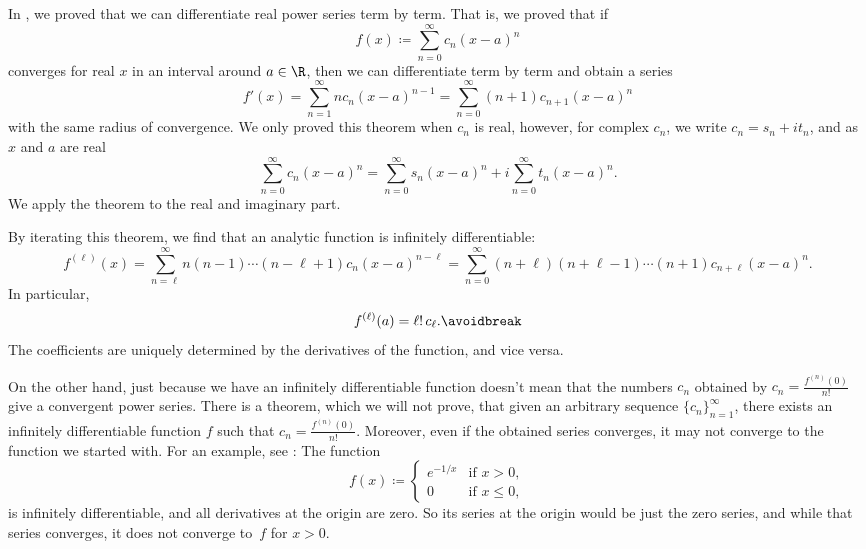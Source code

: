 In , we proved that we can
differentiate real power series term by term.  That is,
we proved that if
\begin{equation*}
f(x) \coloneqq \sum_{n=0}^\infty c_n {(x-a)}^n
\end{equation*}
converges for real $x$ in an interval around $a \in \R$, then we can differentiate
term by term and obtain a series
\begin{equation*}
f'(x) =
\sum_{n=1}^\infty n c_n {(x-a)}^{n-1}
=
\sum_{n=0}^\infty (n+1)c_{n+1} {(x-a)}^{n} 
\end{equation*}
with the same radius of convergence.
We only proved this theorem when $c_n$ is real, however, for complex $c_n$,
we write
$c_n = s_n + i t_n$, and as $x$ and $a$ are real
\begin{equation*}
\sum_{n=0}^\infty c_n {(x-a)}^n
=
\sum_{n=0}^\infty s_n {(x-a)}^n
+
i
\sum_{n=0}^\infty t_n {(x-a)}^n .
\end{equation*}
We apply the theorem to the real and
imaginary part.

By iterating this theorem, we find that an
analytic function is infinitely differentiable:
\begin{equation*}
f^{(\ell)}(x)
=
\sum_{n=\ell}^\infty n(n-1)\cdots(n-\ell+1)c_n {(x-a)}^{n-\ell}
=
\sum_{n=0}^\infty (n+\ell)(n+\ell-1)\cdots (n+1) c_{n+\ell} {(x-a)}^{n} .
\end{equation*}
In particular,
\begin{equation} \label{eq:formulaforpscoeffs}
f^{(\ell)}(a) = \ell! \, c_\ell .
\avoidbreak
\end{equation}
The coefficients are uniquely determined by the derivatives of the
function, and vice versa.

On the other hand, just because we have an infinitely differentiable
function doesn't mean that the numbers $c_n$ obtained by
$c_n = \frac{f^{(n)}(0)}{n!}$ give a convergent power series.
There is a theorem, which we will not prove,
that given an arbitrary sequence $\{ c_n \}_{n=1}^\infty$, there exists an
infinitely differentiable function $f$ such that
$c_n = \frac{f^{(n)}(0)}{n!}$.  Moreover, even if the obtained series
converges, it may not converge to the function we started with.
For an example,
see :  The
function
\begin{equation*}
f(x) \coloneqq
\begin{cases}
e^{-1/x} & \text{if } x > 0,\\
0        & \text{if } x \leq 0,
\end{cases}
\end{equation*}
is infinitely differentiable, and all derivatives at the origin are zero.
So
its series at the origin would be just the zero series, and while that
series converges, it does not converge to~$f$ for $x > 0$.

